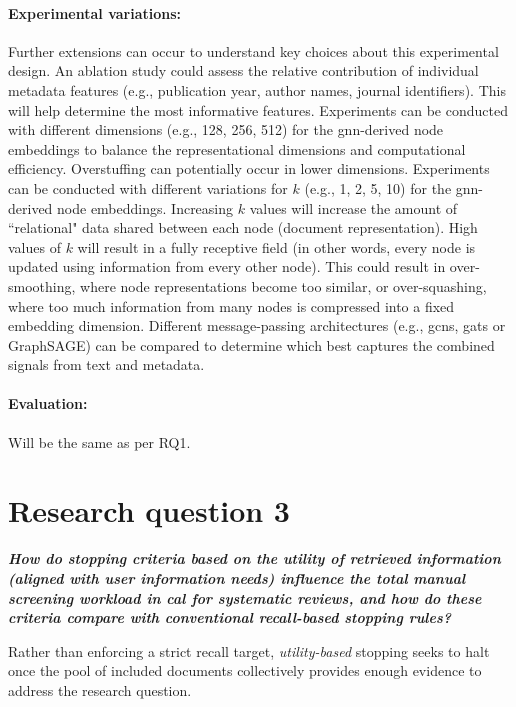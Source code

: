 \documentclass[10pt,oneside]{book}
\begin{document}
\paragraph{Experimental variations:}
Further extensions can occur to understand key choices about this experimental design. An ablation study could assess the relative contribution of individual metadata features (e.g., publication year, author names, journal identifiers). This will help determine the most informative features. Experiments can be conducted with different dimensions (e.g., 128, 256, 512) for the \gls*{gnn}-derived node embeddings to balance the representational dimensions and computational efficiency. Overstuffing can potentially occur in lower dimensions. Experiments can be conducted with different variations for $k$ (e.g., 1, 2, 5, 10) for the \gls*{gnn}-derived node embeddings. Increasing $k$ values will increase the amount of ``relational" data shared between each node (document representation). High values of $k$ will result in a fully receptive field (in other words, every node is updated using information from every other node). This could result in over-smoothing, where node representations become too similar, or over-squashing, where too much information from many nodes is compressed into a fixed embedding dimension. Different message-passing architectures (e.g., \glspl*{gcn}, \glspl*{gat} or GraphSAGE) can be compared to determine which best captures the combined signals from text and metadata.

\paragraph{Evaluation:}
Will be the same as per RQ1. 

\section{Research question 3}

\begin{tcolorbox}[colback=salmon!10, colframe=salmon, sharp corners=southwest, boxrule=0.8pt]
\emph{\textbf{How do stopping criteria based on the utility of retrieved information (aligned with user information needs) influence the total manual screening workload in \gls*{cal} for systematic reviews, and how do these criteria compare with conventional recall-based stopping rules?}}
\end{tcolorbox}

Rather than enforcing a strict recall target, \emph{utility-based} stopping seeks to halt once the pool of included documents collectively provides enough evidence to address the research question. 
\end{document}
